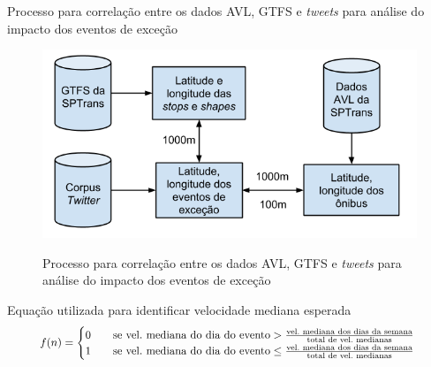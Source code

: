 \documentclass{beamer}
\begin{document}
\begin{frame}{Processo para correlação entre os dados AVL, GTFS e \textit{tweets} para análise do impacto dos eventos de exceção}
\begin{figure}[!htb]
	\centering
 	  \caption{Processo para correlação entre os dados AVL, GTFS e \textit{tweets} para análise do impacto dos eventos de exceção}
		\includegraphics[width=1\linewidth]{avl_tweets_correlation_pt.png}
	\label{fig:avl_tweets_correlation_pt}
\end{figure} 
\end{frame}
\begin{frame}{Equação utilizada para identificar velocidade mediana esperada}
    \begin{equation}
\label{eqVeloc}
\resizebox{.9 \textwidth}{!} 
{$
 f(n) =
  \begin{cases}
    0      & \quad \text{se  vel.~mediana~do~dia~do~evento} > \frac{\text{vel.~mediana~dos~dias~da~semana}}{\text{total~de~vel.~medianas}}\\
    1 & \quad \text{se vel.~mediana~do~dia~do~evento} \leq \frac{\text{vel.~mediana~dos~dias~da~semana}}{\text{total~de~vel.~medianas}}
  \end{cases}$
  }
\end{equation}
\end{frame}
\end{document}
